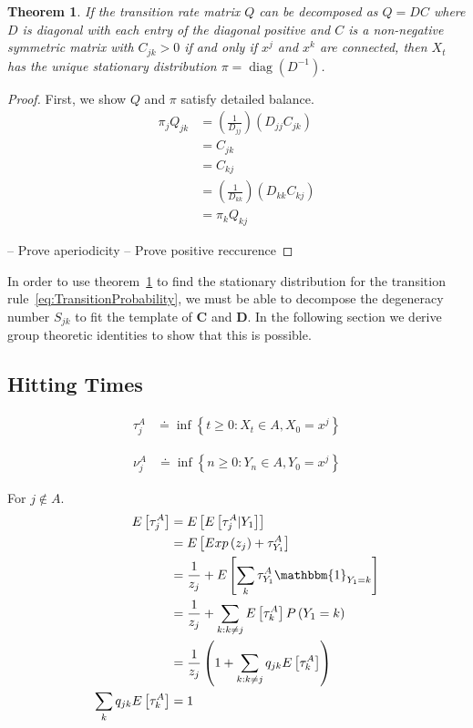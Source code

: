 \documentclass[12pt]{article}
\newtheorem{mythm}{Theorem}
\newcommand{\spc}{ }
\newcommand{\Sjk}{$S_{jk}$}
\DeclareMathOperator{\diag}{diag}
\begin{document}
\begin{mythm}
\label{thm:StatDist}
If the transition rate matrix $Q$ can be decomposed as $Q = DC$ where $D$ is diagonal with each entry of the diagonal positive and $C$ is a non-negative symmetric matrix with $C_{jk} > 0$ if and only if $x^j$ and $x^k$ are connected, then $X_t$ has the unique stationary distribution $\pi = \diag\left(D^{-1}\right)$.         
\end{mythm}
\begin{proof}
First, we show $Q$ and $\pi$ satisfy detailed balance.
\begin{align}
\pi_jQ_{jk} &= \left(\frac{1}{D_{jj}}\right)\left(D_{jj}C_{jk}\right) \\
&= C_{jk} \\
&= C_{kj} \\
&= \left(\frac{1}{D_{kk}}\right)\left(D_{kk}C_{kj}\right) \\
                    &= \pi_kQ_{kj}
\end{align}

-- Prove aperiodicity 
-- Prove positive reccurence

\end{proof}

In order to use theorem~\ref{thm:StatDist} to find the stationary distribution for the transition rule~\ref{eq:TransitionProbability}, we must be able to decompose the degeneracy number \Sjk\spc to fit the template of $\mathbf{C}$ and $\mathbf{D}$. In the following section we derive group theoretic identities to show that this is possible.

\subsection{Hitting Times}

\begin{align}
	\tau^{A}_{j} &\doteq \inf\left\{t \geq 0 : X_t \in A, X_0 = x^j\right\}
\end{align}

\begin{align}
	\nu^{A}_{j} &\doteq \inf\left\{n \geq 0 : Y_n \in A, Y_0 = x^j\right\}
\end{align}

For $j \not\in A$.
\begin{align}
	E\left[\tau^{A}_{j}\right] &= E\left[E\left[\tau^{A}_{j} | Y_1 \right]\right] \\
        &= E\left[ Exp\left(z_j\right) + \tau^{A}_{Y_1} \right] \\
        &=  \frac{1}{z_j} + E\left[\sum_{k}\tau^{A}_{Y_1}\mathbbm{1}_{Y_1 = k}\right] \\
        &=  \frac{1}{z_j} + \sum_{k: k\neq j}E\left[\tau^{A}_{k}\right] P\left(Y_1 = k\right) \\
        &=  \frac{1}{z_j}\left(1 + \sum_{k: k\neq j}q_{jk}E\left[\tau^{A}_{k}\right]\right)     \\
  \sum_{k}q_{jk}E\left[\tau^{A}_{k}\right] &= 1 \\
\end{align}
\end{document}
